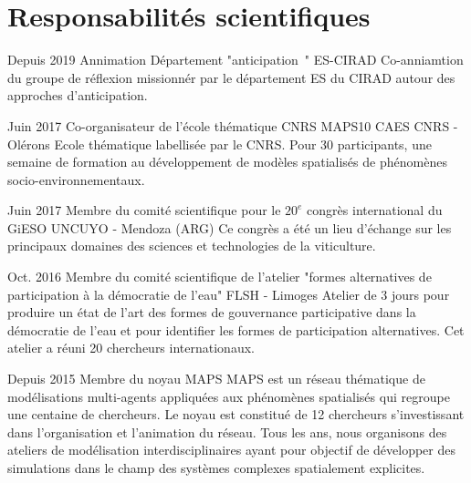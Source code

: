 \documentclass[]{cv-etienne}
\begin{document}
\section{Responsabilités scientifiques}
\begin{entrylist}
  \entry
  {Depuis 2019}
  {Annimation Département "anticipation "}
  {ES-CIRAD}
  {Co-anniamtion du groupe de réflexion missionnér par le département ES du CIRAD autour des approches d'anticipation.}
\end{entrylist}
\begin{entrylist}
  \entry
  {Juin 2017}
  {Co-organisateur de l'école thématique CNRS MAPS10}
  {CAES CNRS - Olérons}
  {Ecole thématique labellisée par le CNRS. Pour 30 participants, une semaine de formation au développement de modèles spatialisés de phénomènes socio-environnementaux.}
\end{entrylist}
\begin{entrylist}
  \entry
  {Juin 2017}
  {Membre du comité scientifique pour le $20^{e}$ congrès international du GiESO}
  {UNCUYO - Mendoza (ARG)}
  {Ce congrès a été un lieu d'échange sur les principaux domaines des sciences et technologies de la viticulture.}
\end{entrylist}
\begin{entrylist}
  \entry
  {Oct. 2016}
  {Membre du comité scientifique de l'atelier "formes alternatives de participation à la démocratie de l'eau"}
  {FLSH - Limoges}
  {Atelier de 3 jours pour produire un état de l'art des formes de gouvernance participative dans la démocratie de l'eau et pour identifier les formes de participation alternatives. Cet atelier a réuni 20 chercheurs internationaux.}
\end{entrylist}
\begin{entrylist}
  \entry
  {Depuis 2015}
  {Membre du noyau MAPS}
  {}
  {MAPS est un réseau thématique de modélisations multi-agents appliquées aux phénomènes spatialisés qui regroupe une centaine de chercheurs. Le noyau est constitué de 12 chercheurs s'investissant dans l'organisation et l'animation du réseau. Tous les ans, nous organisons des ateliers de modélisation interdisciplinaires ayant pour objectif de développer des simulations dans le champ des systèmes complexes spatialement explicites.}
\end{entrylist}
\end{document}
